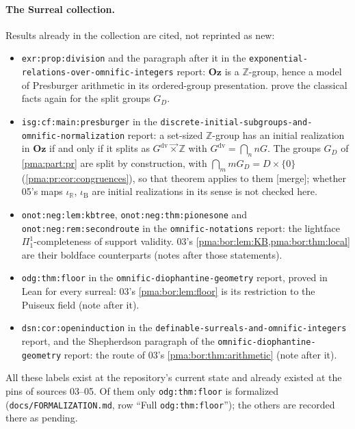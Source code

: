 \documentclass[11pt]{article}
\numberwithin{equation}{section}
\theoremstyle{definition}
\theoremstyle{remark}
\newcommand{\Z}{\mathbb Z}
\newcommand{\R}{\mathbb R}
\newcommand{\Oz}{\mathbf{Oz}}
\newcommand{\lex}{\mathbin{\overrightarrow\times}}
\newcommand{\GD}{G_D}
\newcommand{\mergetag}{\textup{\textsf{\small[merge]}}}
\newcommand{\replabel}[1]{\nolinkurl{#1}}
\newcommand{\fn}[1]{\nolinkurl{#1}}
\begin{document}
\paragraph{The Surreal collection.} Results already in the collection are
cited, not reprinted as new:
\begin{itemize}
\item \replabel{exr:prop:division} and the paragraph after it in the
\fn{exponential-relations-over-omnific-integers} report: $\Oz$ is a
$\Z$-group, hence a model of Presburger arithmetic in its ordered-group
presentation.  prove the classical
facts again for the split groups $\GD$.
\item \replabel{isg:cf:main:presburger} in the
\fn{discrete-initial-subgroups-and-omnific-normalization} report: a set-sized
$\Z$-group has an initial realization in $\Oz$ if and only if it splits as
$G^{\mathrm{dv}}\lex\Z$ with $G^{\mathrm{dv}}=\bigcap_n nG$. The groups $\GD$
of \cref{pma:part:pr} are split by construction, with $\bigcap_m m\GD=D\times\{0\}$
(\cref{pma:pr:cor:congruences}), so that theorem applies to them \mergetag;
whether 05's maps $\iota_{\R}$, $\iota_{\mathrm B}$ are initial
realizations in its sense is not checked here.
\item \replabel{onot:neg:lem:kbtree}, \replabel{onot:neg:thm:pionesone} and
\replabel{onot:neg:rem:secondroute} in the \fn{omnific-notations} report: the
lightface $\Pi^1_1$-completeness of support validity. 03's
\cref{pma:bor:lem:KB,pma:bor:thm:local} are their boldface counterparts
(notes after those statements).
\item \replabel{odg:thm:floor} in the \fn{omnific-diophantine-geometry}
report, proved in Lean for every surreal: 03's \cref{pma:bor:lem:floor} is its
restriction to the Puiseux field (note after it).
\item \replabel{dsn:cor:openinduction} in the
\fn{definable-surreals-and-omnific-integers} report, and the Shepherdson
paragraph of the \fn{omnific-diophantine-geometry} report: the route of 03's
\cref{pma:bor:thm:arithmetic} (note after it).
\end{itemize}
All these labels exist at the repository's current state and already existed
at the pins of sources 03--05. Of them only \replabel{odg:thm:floor} is formalized
(\fn{docs/FORMALIZATION.md}, row ``Full \texttt{odg:thm:floor}''); the others
are recorded there as pending.
\end{document}
